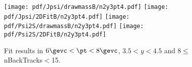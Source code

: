 \begin{figure}[H]
\begin{center}
\texttt{[image: pdf/Jpsi/drawmassB/n2y3pt4.pdf]}
\texttt{[image: pdf/Jpsi/2DFitB/n2y3pt4.pdf]}
\vspace*{-0.5cm}
\texttt{[image: pdf/Psi2S/drawmassB/n2y3pt4.pdf]}
\texttt{[image: pdf/Psi2S/2DFitB/n2y3pt4.pdf]}
\vspace*{-0.5cm}
\end{center}
\caption{Fit results in $6\gevc<\pt<8\gevc$, $3.5<y<4.5$ and 8$\leq$nBackTracks$<$15.}
\label{Fitn2y3pt4}
\end{figure}
